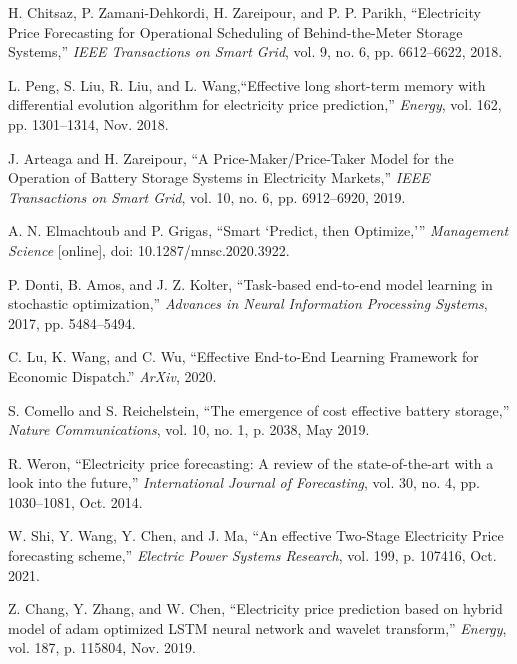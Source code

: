 \documentclass[journal]{IEEEtran}
\begin{document}
\ifCLASSOPTIONcaptionsoff
  \newpage
\fi



\begin{thebibliography}{2}

H. Chitsaz, P. Zamani-Dehkordi, H. Zareipour, and P. P. Parikh, “Electricity Price Forecasting for Operational Scheduling of Behind-the-Meter Storage Systems,” \emph{IEEE Transactions on Smart Grid}, vol. 9, no. 6, pp. 6612–6622, 2018.

L. Peng, S. Liu, R. Liu, and L. Wang,``Effective long short-term memory with differential evolution algorithm for electricity price prediction,” \emph{Energy}, vol. 162, pp. 1301–1314, Nov. 2018.

J. Arteaga and H. Zareipour, “A Price-Maker/Price-Taker Model for the Operation of Battery Storage Systems in Electricity Markets,” \emph{IEEE Transactions on Smart Grid}, vol. 10, no. 6, pp. 6912–6920, 2019.

A. N. Elmachtoub and P. Grigas, ``Smart `Predict, then Optimize,’” \emph{Management Science} [online], doi: 10.1287/mnsc.2020.3922.

P. Donti, B. Amos, and J. Z. Kolter, “Task-based end-to-end model learning in stochastic optimization,” \emph{Advances in Neural Information Processing Systems}, 2017, pp. 5484–5494.

C. Lu, K. Wang, and C. Wu, “Effective End-to-End Learning Framework for Economic Dispatch.” \emph{ArXiv}, 2020.


S. Comello and S. Reichelstein, “The emergence of cost effective battery storage,” \emph{Nature Communications}, vol. 10, no. 1, p. 2038, May 2019.

R. Weron, ``Electricity price forecasting: A review of the state-of-the-art with a look into the future,” \emph{International Journal of Forecasting}, vol. 30, no. 4, pp. 1030–1081, Oct. 2014.


W. Shi, Y. Wang, Y. Chen, and J. Ma, “An effective Two-Stage Electricity Price forecasting scheme,” \emph{Electric Power Systems Research}, vol. 199, p. 107416, Oct. 2021.

Z. Chang, Y. Zhang, and W. Chen, “Electricity price prediction based on hybrid model of adam optimized LSTM neural network and wavelet transform,” \emph{Energy}, vol. 187, p. 115804, Nov. 2019.


\end{thebibliography}
\end{document}
